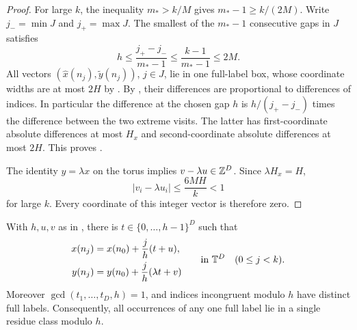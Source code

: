 \begin{proof}
For large $k$, the inequality $m_*>k/M$ gives
$m_*-1\ge k/(2M)$. Write $j_-=\min J$ and $j_+=\max J$.
The smallest of the $m_*-1$ consecutive gaps in $J$ satisfies
\[
 h\le\frac{j_+-j_-}{m_*-1}\le\frac{k-1}{m_*-1}\le2M.
\]
All vectors $(\hat x(n_j),\tilde y(n_j))$, $j\in J$, lie in
one full-label box, whose coordinate widths are at most $2H$ by
. By , their differences
are proportional to differences of indices. In particular the
difference at the chosen gap $h$ is $h/(j_+-j_-)$ times the difference
between the two extreme visits. The latter has first-coordinate
absolute differences at most $H_x$ and second-coordinate absolute
differences at most $2H$. This proves .

The identity $y=\lambda x$ on the torus implies
$v-\lambda u\in\mathbb Z^D$. Since $\lambda H_x=H$,
\[
 |v_i-\lambda u_i|\le\frac{6MH}{k}<1
\]
for large $k$. Every coordinate of this integer vector is therefore
zero.
\end{proof}

\begin{lemma}\label{dichotomy:path}
With $h,u,v$ as in , there is
$t\in\{0,\ldots,h-1\}^D$ such that
\begin{equation}\label{dichotomy:path-equations}
 \begin{aligned}
 x(n_j)&=x(n_0)+\frac jh(t+u),\\
 y(n_j)&=y(n_0)+\frac jh(\lambda t+v)
 \end{aligned}
 \qquad\text{in }\mathbb T^D\quad(0\le j<k).
\end{equation}
Moreover $\gcd(t_1,\ldots,t_D,h)=1$, and indices incongruent
modulo $h$ have distinct full labels. Consequently, all occurrences
of any one full label lie in a single residue class modulo $h$.
\end{lemma}

